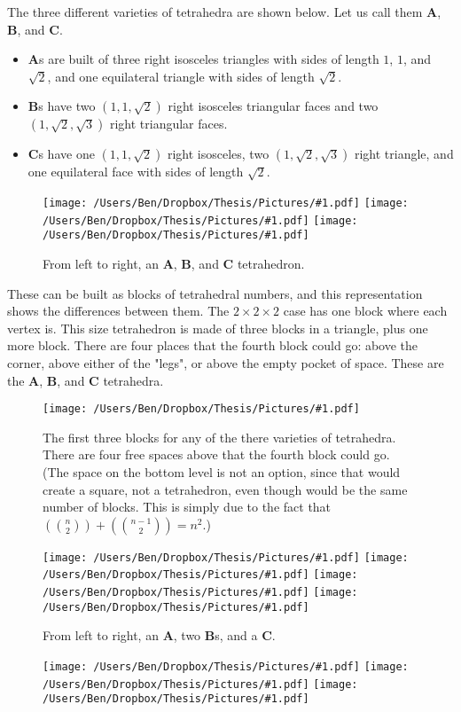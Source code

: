 \documentclass[12pt]{scrippsthesis}
\newcommand{\pic}[2]{\texttt{[image: /Users/Ben/Dropbox/Thesis/Pictures/\#1.pdf]}}
\newcommand{\mchoose}[2]{{\textstyle \left( \! {#1 \choose #2} \! \right)}}
\theoremstyle{definition}
\theoremstyle{remark}
\theoremstyle{plain}
\begin{document}
The three different varieties of tetrahedra are shown below.  Let us call them {\bf A}, {\bf B}, and {\bf C}.
\begin{itemize}
\item {\bf A}s are built of three right isosceles triangles with sides of length $1$, $1$, and $\sqrt{2}$, and one equilateral triangle with sides of length $\sqrt{2}$.
\item {\bf B}s have two $(1, 1, \sqrt{2})$ right isosceles triangular faces and two $(1,\sqrt{2},\sqrt{3})$ right triangular faces.  
\item {\bf C}s have one $(1,1,\sqrt{2})$ right isosceles, two $(1,\sqrt{2},\sqrt{3})$ right triangle, and one equilateral face with sides of length $\sqrt{2}$.
\end{itemize}

\begin{figure}[H]
\centerline{\hfill
\pic{A}{scale=.5}\hfill
\pic{B}{scale=.5}\hfill
\pic{C}{scale=.5}\hfill}
\caption{From left to right, an {\bf A}, {\bf B}, and {\bf C} tetrahedron.}
\end{figure}

These can be built as blocks of tetrahedral numbers, and this representation shows the differences between them.  The $2\times2\times2$ case has one block where each vertex is.  This size tetrahedron is made of three blocks in a triangle, plus one more block.  There are four places that the fourth block could go: above the corner, above either of the "legs", or above the empty pocket of space.  These are the {\bf A}, {\bf B}, and {\bf C} tetrahedra.

\begin{figure}[H]
\centerline{\pic{build-triangle}{width=1in}}
\caption{The first three blocks for any of the there varieties of tetrahedra.  There are four free spaces above that the fourth block could go.  (The space on the bottom level is not an option, since that would create a square, not a tetrahedron, even though would be the same number of blocks.  This is simply due to the fact that $\mchoose{n}{2}+\mchoose{n-1}{2}=n^2$.)}
\end{figure}
\begin{figure}[H]
\centerline{\hfill
\pic{build-A}{width=1in}\hfill
\pic{build-B}{width=1in}\hfill
\pic{build-B2}{width=1in}\hfill
\pic{build-C}{width=1in}\hfill}
\caption{  From left to right, an {\bf A}, two {\bf B}s, and a {\bf C}.  }
\end{figure}

\begin{figure}[H]
\centerline{\hfill
\pic{blockA}{scale=.5}\hfill
\pic{blockB}{scale=.5}\hfill
\pic{blockC}{scale=.5}\hfill}
\caption{}
\end{figure}
\end{document}
